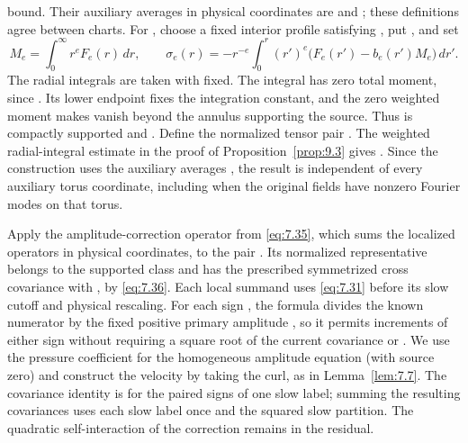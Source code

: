 %
bound. Their auxiliary averages in physical coordinates are
 and
; these definitions agree between
charts. For , choose a fixed interior profile
 satisfying
, put
, and set
\[
 M_e=\int_0^\infty r^eF_e(r)\,dr,
 \qquad
 \sigma_e(r)=-r^{-e}\int_0^r(r')^e\bigl(F_e(r')-b_e(r')M_e\bigr)\,dr'.
\]
The radial integrals are taken with  fixed. The integral has zero total
moment, since
. Its lower endpoint fixes the
integration constant, and the zero weighted moment makes  vanish
beyond the annulus supporting the source. Thus  is compactly
supported and . Define the
normalized tensor pair . The weighted
radial-integral estimate in the proof of Proposition~\ref{prop:9.3} gives
. Since the construction uses the auxiliary
averages , the result is independent of every auxiliary torus coordinate,
including when the original fields have nonzero Fourier modes on that torus.

Apply the amplitude-correction operator 
from \eqref{eq:7.35}, which sums the localized operators in physical coordinates, to the pair
. Its normalized representative
 belongs to the supported class
 and has the prescribed symmetrized cross covariance
 with , by
\eqref{eq:7.36}. Each local summand uses \eqref{eq:7.31} before its slow cutoff and physical
rescaling. For each sign , the formula divides the known
numerator by the fixed positive primary amplitude , so it
permits increments of either sign without requiring a square root of the current covariance or
. We use the pressure coefficient for the homogeneous amplitude
equation (with source zero) and construct the velocity by taking the curl, as in
Lemma~\ref{lem:7.7}. The covariance identity is for the paired signs of one slow label; summing the
resulting covariances uses each slow label once and the squared slow partition. The quadratic
self-interaction of the correction remains in the residual.

